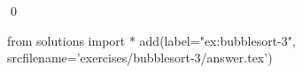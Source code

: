 
    \begin{ex}
  \label{ex:bubblesort-3}
  
  \qed
\end{ex}
\begin{python0}
from solutions import *
add(label="ex:bubblesort-3",
    srcfilename='exercises/bubblesort-3/answer.tex') 
\end{python0}                              
